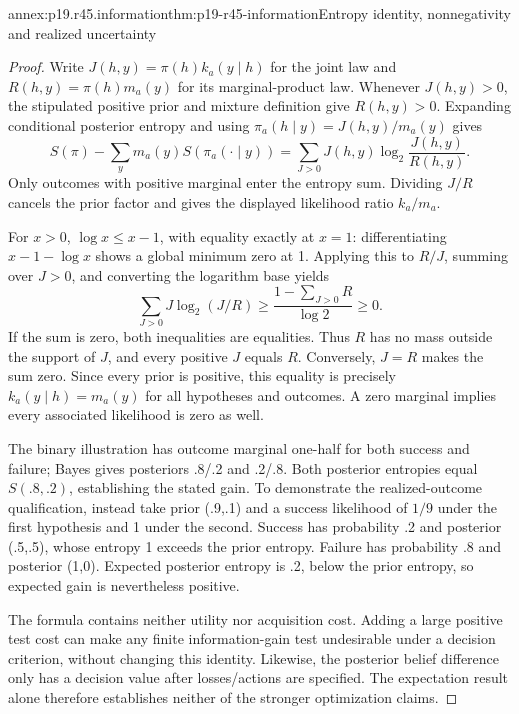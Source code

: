 \begin{annexitem}{annex:p19.r45.information}{thm:p19-r45-information}{Entropy identity, nonnegativity and realized uncertainty}
\begin{proof}
Write \(J(h,y)=\pi(h)k_a(y\mid h)\) for the joint law and
\(R(h,y)=\pi(h)m_a(y)\) for its marginal-product law. Whenever
\(J(h,y)>0\), the stipulated positive prior and mixture definition
give \(R(h,y)>0\). Expanding conditional posterior entropy and
using \(\pi_a(h\mid y)=J(h,y)/m_a(y)\) gives
\[
 S(\pi)-\sum_y m_a(y)S(\pi_a(\cdot\mid y))
 =\sum_{J>0}J(h,y)\log_2\frac{J(h,y)}{R(h,y)}.
\]
Only outcomes with positive marginal enter the entropy sum. Dividing
\(J/R\) cancels the prior factor and gives the displayed likelihood
ratio \(k_a/m_a\).

For \(x>0\), \(\log x\leq x-1\), with equality exactly at
\(x=1\): differentiating \(x-1-\log x\) shows a global minimum
zero at 1. Applying this to \(R/J\), summing over \(J>0\),
and converting the logarithm base yields
\[
 \sum_{J>0}J\log_2(J/R)
 \geq\frac{1-\sum_{J>0}R}{\log 2}\geq0.
\]
If the sum is zero, both inequalities are equalities. Thus \(R\)
has no mass outside the support of \(J\), and every positive
\(J\) equals \(R\). Conversely, \(J=R\) makes the sum zero.
Since every prior is positive, this equality is precisely
\(k_a(y\mid h)=m_a(y)\) for all hypotheses and outcomes. A
zero marginal implies every associated likelihood is zero as well.

The binary illustration has outcome marginal one-half for both
success and failure; Bayes gives posteriors .8/.2 and .2/.8.
Both posterior entropies equal \(S(.8,.2)\), establishing the stated
gain. To demonstrate the realized-outcome qualification, instead take
prior (.9,.1) and a success likelihood of \(1/9\) under the first
hypothesis and 1 under the second. Success has probability .2 and
posterior (.5,.5), whose entropy 1 exceeds the prior entropy. Failure
has probability .8 and posterior (1,0). Expected posterior entropy is
.2, below the prior entropy, so expected gain is nevertheless positive.

The formula contains neither utility nor acquisition cost. Adding a
large positive test cost can make any finite information-gain test
undesirable under a decision criterion, without changing this identity.
Likewise, the posterior belief difference only has a decision value
after losses/actions are specified. The expectation result alone
therefore establishes neither of the stronger optimization claims.
\end{proof}
\end{annexitem}

